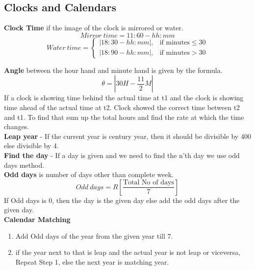\subsection{Clocks and Calendars}
\begin{fleqn}
\textbf{Clock Time} if the image of the clock is mirrored or water.
\[Mirror\ time=11:60-hh:mm\]
\[
Water\ time=
\begin{cases}
    |18:30-hh:mm|, &\text{if minutes} \leq 30\\
    |18:90-hh:mm|, &\text{if minutes} > 30
\end{cases}
\]
\end{fleqn}
\textbf{Angle} between the hour hand and minute hand is given by the formula.
\[\theta = |30H-\frac{11}{2}M|\]
If a clock is showing time behind the actual time at t1 and the clock is showing time ahead of the actual time at t2. Clock showed the correct time between t2 and t1. To find that sum up the total hours and find the rate at which the time changes.\\
\textbf{Leap year} - If the current year is century year, then it should be divisible by 400 else divisible by 4.\vspace{0.2cm}\\
\textbf{Find the day} - If a day is given and we need to find the n'th day we use odd days method.\vspace{0.2cm}\vspace{0.2cm}\\
\textbf{Odd days} is number of days other than complete week.\vspace{0.2cm}\\
\[Odd\ days=R\left[\frac{\text{Total No of days}}{7} \right]\]
If Odd days is 0, then the day is the given day else add the odd days after the given day.\vspace{0.2cm}\\
\textbf{Calendar Matching}
\begin{enumerate}
    \item Add Odd days of the year from the given year till 7.
    \item if the year next to that is leap and the actual year is not leap or viceversa, Repeat Step 1, else the next year is matching year.
\end{enumerate} 


